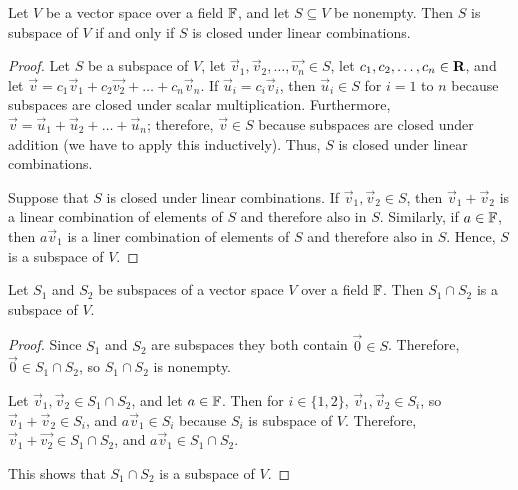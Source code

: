 \documentclass{homework}
\begin{document}
	\question Let $V$ be a vector space over a field $\mathbb{F}$, and let $S \subseteq V$ be nonempty. Then $S$ is subspace of $V$ if and only if $S$ is closed under linear combinations.
	\begin{proof}
		Let $S$ be a subspace of $V$, let $\vec{v}_1, \vec{v}_2, \dots, \vec{v_n} \in S$, let $c_1,c_2,\dots,c_n \in \textnormal{\bf R}$, and let $\vec{v} = c_1\vec{v}_1 + c_2\vec{v_2} + \dots + c_n\vec{v}_n$. If $\vec{u}_i = c_i\vec{v}_i$, then $\vec{u}_i \in S$ for $i=1$ to $n$ because subspaces are closed under scalar multiplication. Furthermore, $\vec{v} = \vec{u}_1+ \vec{u}_2 + \dots + \vec{u}_n$; therefore, $\vec{v} \in S$ because subspaces are closed under addition (we have to apply this inductively). Thus, $S$ is closed under linear combinations.
		
		Suppose that $S$ is closed under linear combinations. If $\vec{v}_1, \vec{v}_2 \in S$, then $\vec{v}_1 + \vec{v}_2$ is a linear combination of elements of $S$ and therefore also in $S$. Similarly, if $a \in \mathbb{F}$, then $a\vec{v}_1$ is a liner combination of elements of $S$ and therefore also in $S$. Hence, $S$ is a subspace of $V$.
	\end{proof}
	
	\question Let $S_1$ and $S_2$ be subspaces of a vector space $V$ over a field $\mathbb{F}$. Then $S_1 \cap S_2$ is a subspace of $V$.
	\begin{proof}
		Since $S_1$ and $S_2$ are subspaces they both contain $\vec{0} \in S$. Therefore, $\vec{0} \in S_1 \cap S_2$, so $S_1\cap S_2$ is nonempty.
		
		Let $\vec{v}_1, \vec{v}_2 \in S_1 \cap S_2$, and let $a \in \mathbb{F}$. Then for $i \in \{1,2\}$, $\vec{v}_1,\vec{v}_2\in S_i$, so $\vec{v}_1 + \vec{v}_2 \in S_i$, and $a\vec{v}_1 \in S_i$ because $S_i$ is subspace of $V$. Therefore, $\vec{v}_1 + \vec{v_2} \in S_1 \cap S_2$, and $a\vec{v}_1 \in S_1\cap S_2$.
		
		This shows that $S_1 \cap S_2$ is a subspace of $V$.
	\end{proof}
	
\end{document}
